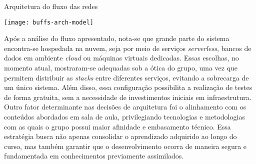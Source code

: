 \begin{flowchart}[!htb]
\centering
\caption{Arquitetura do fluxo das redes}%
\label{fcht:arquitetura}
\texttt{[image: buffs-arch-model]}
\end{flowchart}

Após a análise do fluxo apresentado, nota-se que grande parte do sistema encontra-se hospedada na nuvem, seja por meio de serviços \textit{serverless}, bancos de dados em ambiente \textit{cloud} ou máquinas virtuais dedicadas. Essas escolhas, no momento atual, mostraram-se adequadas sob a ótica do grupo, uma vez que permitem distribuir as \textit{stacks} entre diferentes serviços, evitando a sobrecarga de um único sistema. Além disso, essa configuração possibilita a realização de testes de forma gratuita, sem a necessidade de investimentos iniciais em infraestrutura. Outro fator determinante nas decisões de arquitetura foi o alinhamento com os conteúdos abordados em sala de aula, privilegiando tecnologias e metodologias com as quais o grupo possui maior afinidade e embasamento técnico. Essa estratégia busca não apenas consolidar o aprendizado adquirido ao longo do curso, mas também garantir que o desenvolvimento ocorra de maneira segura e fundamentada em conhecimentos previamente assimilados.


